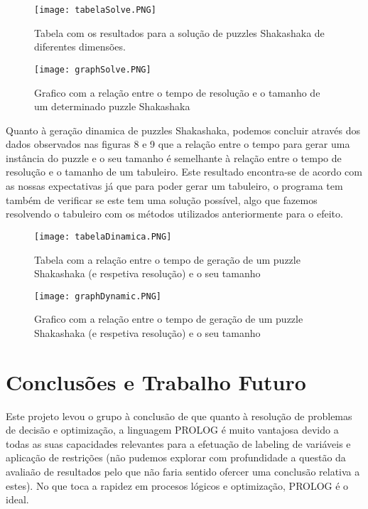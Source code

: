 \documentclass[runningheads]{llncs}
\begin{document}
\begin{figure}
\begin{center}
\texttt{[image: tabelaSolve.PNG]}
\caption{Tabela com os resultados para a solução de puzzles Shakashaka de diferentes dimensões.} 
\label{tabelaSolve.PNG}
\end{center}
\end{figure}

\begin{figure}
\begin{center}
\texttt{[image: graphSolve.PNG]}
\caption{Grafico com a relação entre o tempo de resolução e o tamanho de um determinado puzzle Shakashaka} 
\label{graphSolve.PNG}
\end{center}
\end{figure}

Quanto à geração dinamica de puzzles Shakashaka, podemos concluir através dos dados observados nas figuras 8 e 9 que a relação entre o tempo para gerar uma instância do puzzle e o seu tamanho é semelhante à relação entre o tempo de resolução e o tamanho de um tabuleiro. Este resultado encontra-se de acordo com as nossas expectativas já que para poder gerar um tabuleiro, o programa tem também de verificar se este tem uma solução possível, algo que fazemos resolvendo o tabuleiro com os métodos utilizados anteriormente para o efeito.

\begin{figure}
\begin{center}
\texttt{[image: tabelaDinamica.PNG]}
\caption{Tabela com a relação entre o tempo de geração de um puzzle Shakashaka (e respetiva resolução) e o seu tamanho} 
\label{tabelaDinamica.PNG}
\end{center}
\end{figure}

\begin{figure}
\begin{center}
\texttt{[image: graphDynamic.PNG]}
\caption{Grafico com a relação entre o tempo de geração de um puzzle Shakashaka (e respetiva resolução) e o seu tamanho} 
\label{grahDynamic.PNG}
\end{center}
\end{figure}


\section{Conclusões e Trabalho Futuro}
Este projeto levou o grupo à conclusão de que quanto à resolução de problemas de decisão e optimização, a linguagem PROLOG é muito vantajosa devido a todas as suas capacidades relevantes para a efetuação de labeling de variáveis e aplicação de restrições (não pudemos explorar com profundidade a questão da avaliaão de resultados pelo que não faria sentido ofercer uma conclusão relativa a estes). No que toca a rapidez em procesos lógicos e optimização, PROLOG é o ideal.
\end{document}
